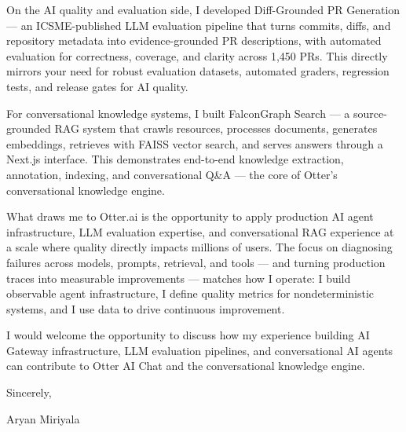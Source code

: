 \documentclass[letterpaper,11pt]{article}
\begin{document}
\vspace{4pt}

On the AI quality and evaluation side, I developed Diff-Grounded PR Generation — an ICSME-published LLM evaluation pipeline that turns commits, diffs, and repository metadata into evidence-grounded PR descriptions, with automated evaluation for correctness, coverage, and clarity across 1,450 PRs. This directly mirrors your need for robust evaluation datasets, automated graders, regression tests, and release gates for AI quality.

\vspace{4pt}

For conversational knowledge systems, I built FalconGraph Search — a source-grounded RAG system that crawls resources, processes documents, generates embeddings, retrieves with FAISS vector search, and serves answers through a Next.js interface. This demonstrates end-to-end knowledge extraction, annotation, indexing, and conversational Q\&A — the core of Otter's conversational knowledge engine.

\vspace{4pt}

What draws me to Otter.ai is the opportunity to apply production AI agent infrastructure, LLM evaluation expertise, and conversational RAG experience at a scale where quality directly impacts millions of users. The focus on diagnosing failures across models, prompts, retrieval, and tools — and turning production traces into measurable improvements — matches how I operate: I build observable agent infrastructure, I define quality metrics for nondeterministic systems, and I use data to drive continuous improvement.

\vspace{4pt}

I would welcome the opportunity to discuss how my experience building AI Gateway infrastructure, LLM evaluation pipelines, and conversational AI agents can contribute to Otter AI Chat and the conversational knowledge engine.

\vspace{8pt}

Sincerely,

\vspace{4pt}

Aryan Miriyala
\end{document}
